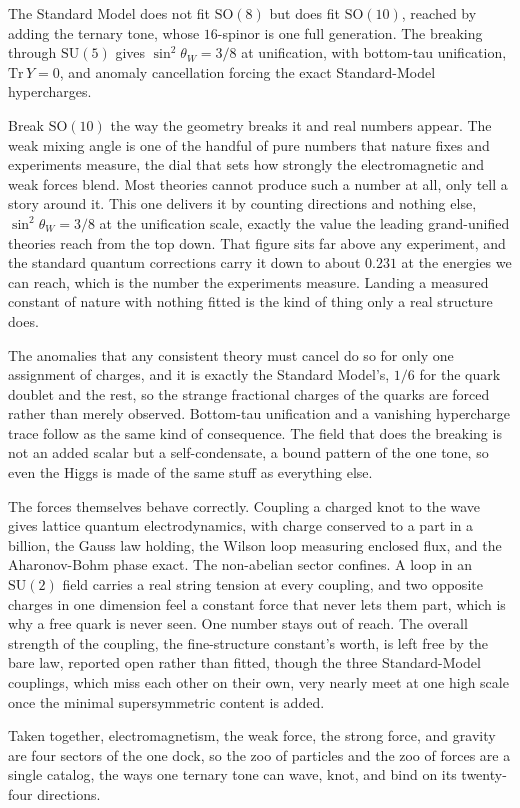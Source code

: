 \begin{result}
The Standard Model does not fit $\mathrm{SO}(8)$ but does fit $\mathrm{SO}(10)$, reached by adding the ternary tone, whose $16$-spinor is one full generation. The breaking through $\mathrm{SU}(5)$ gives $\sin^2\theta_W = 3/8$ at unification, with bottom-tau unification, $\mathrm{Tr}\,Y = 0$, and anomaly cancellation forcing the exact Standard-Model hypercharges. \cite{pollard2026vibetest}
\end{result}

Break $\mathrm{SO}(10)$ the way the geometry breaks it and real numbers appear. The weak mixing angle is one of the handful of pure numbers that nature fixes and experiments measure, the dial that sets how strongly the electromagnetic and weak forces blend. Most theories cannot produce such a number at all, only tell a story around it. This one delivers it by counting directions and nothing else, $\sin^2\theta_W = 3/8$ at the unification scale, exactly the value the leading grand-unified theories reach from the top down. That figure sits far above any experiment, and the standard quantum corrections carry it down to about $0.231$ at the energies we can reach, which is the number the experiments measure. Landing a measured constant of nature with nothing fitted is the kind of thing only a real structure does.

The anomalies that any consistent theory must cancel do so for only one assignment of charges, and it is exactly the Standard Model's, $1/6$ for the quark doublet and the rest, so the strange fractional charges of the quarks are forced rather than merely observed. Bottom-tau unification and a vanishing hypercharge trace follow as the same kind of consequence. The field that does the breaking is not an added scalar but a self-condensate, a bound pattern of the one tone, so even the Higgs is made of the same stuff as everything else.

The forces themselves behave correctly. Coupling a charged knot to the wave gives lattice quantum electrodynamics, with charge conserved to a part in a billion, the Gauss law holding, the Wilson loop measuring enclosed flux, and the Aharonov-Bohm phase exact. The non-abelian sector confines. A loop in an $\mathrm{SU}(2)$ field carries a real string tension at every coupling, and two opposite charges in one dimension feel a constant force that never lets them part, which is why a free quark is never seen. One number stays out of reach. The overall strength of the coupling, the fine-structure constant's worth, is left free by the bare law, reported open rather than fitted, though the three Standard-Model couplings, which miss each other on their own, very nearly meet at one high scale once the minimal supersymmetric content is added.

Taken together, electromagnetism, the weak force, the strong force, and gravity are four sectors of the one dock, so the zoo of particles and the zoo of forces are a single catalog, the ways one ternary tone can wave, knot, and bind on its twenty-four directions.

